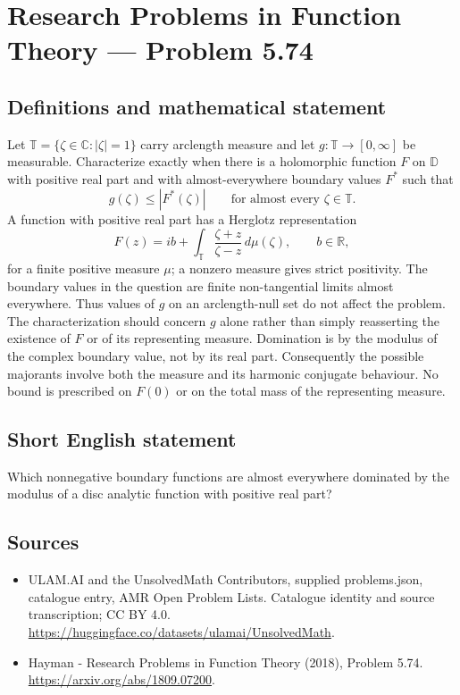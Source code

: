 \documentclass[11pt,a4paper]{article}
\begin{document}
\section*{Research Problems in Function Theory — Problem 5.74}\label{statement}

\subsection{Definitions and mathematical statement}
Let $\mathbb T=\{\zeta\in\mathbb C:|\zeta|=1\}$ carry arclength measure and let $g:\mathbb T\to[0,\infty]$ be measurable. Characterize exactly when there is a holomorphic function $F$ on $\mathbb D$ with positive real part and with almost-everywhere boundary values $F^*$ such that
\[
g(\zeta)\le|F^*(\zeta)|\qquad\text{for almost every }\zeta\in\mathbb T.
\]
A function with positive real part has a Herglotz representation
\[
F(z)=ib+\int_{\mathbb T}\frac{\zeta+z}{\zeta-z}\,d\mu(\zeta),
\qquad b\in\mathbb R,
\]
for a finite positive measure $\mu$; a nonzero measure gives strict positivity. The boundary values in the question are finite non-tangential limits almost everywhere. Thus values of $g$ on an arclength-null set do not affect the problem.
The characterization should concern $g$ alone rather than simply reasserting the existence of $F$ or of its representing measure. Domination is by the modulus of the complex boundary value, not by its real part. Consequently the possible majorants involve both the measure and its harmonic conjugate behaviour. No bound is prescribed on $F(0)$ or on the total mass of the representing measure.
\subsection{Short English statement}
Which nonnegative boundary functions are almost everywhere dominated by the modulus of a disc analytic function with positive real part?
\subsection{Sources}
\begin{itemize}
\item[S1] ULAM.AI and the UnsolvedMath Contributors, supplied problems.json, catalogue entry, AMR Open Problem Lists. Catalogue identity and source transcription; CC BY 4.0.
\url{https://huggingface.co/datasets/ulamai/UnsolvedMath}.
\item[S2] Hayman - Research Problems in Function Theory (2018), Problem 5.74. 
\url{https://arxiv.org/abs/1809.07200}.
\end{itemize}
\end{document}
